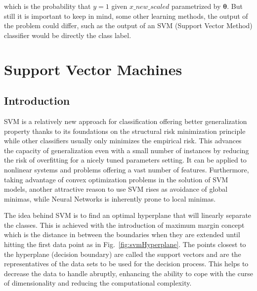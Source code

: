 which is the probability that $y = 1$ given $x\_new\_scaled$ parametrized by $\bm{\theta}$. 
But still it is important to keep in mind, some other learning methods, the output of the problem could differ, such as the output of an SVM (Support Vector Method) classifier would be directly the class label.



\section{Support Vector Machines}

\subsection{Introduction}

SVM is a relatively new approach for classification offering better generalization property thanks to its foundations on the structural risk minimization principle \cite{gunn1998support,yin2014study} while other classifiers usually only minimizes the empirical risk. This advances the capacity of generalization even with a small number of instances by reducing the risk of overfitting for a nicely tuned parameters setting. It can be applied to nonlinear systems and problems offering a vast number of features. Furthermore, taking advantage of convex optimization problems in the solution of SVM models, another attractive reason to use SVM rises as avoidance of global minimas, while Neural Networks is inherently prone to local minimas.

The idea behind SVM is to find an optimal hyperplane that will linearly separate the classes. This is achieved with the introduction of maximum margin concept which is the distance in between the boundaries when they are extended until hitting the first data point as in Fig.~\ref{fig:svmHyperplane}. The points closest to the hyperplane (decision boundary) are called the support vectors and are the representatives of the data sets to be used for the decision process. This helps to decrease the data to handle abruptly, enhancing the ability to cope with the curse of dimensionality and reducing the computational complexity.

